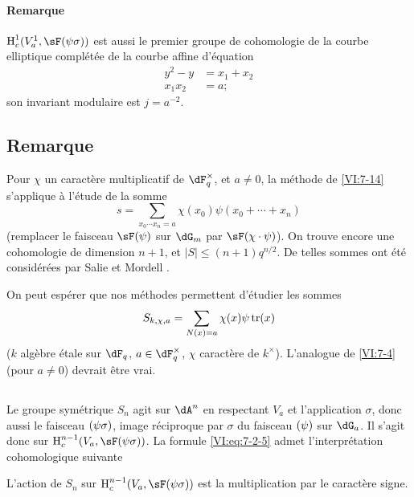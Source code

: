 \paragraph{Remarque}

$\h_c^1(V_a^1,\sF(\psi\sigma))$ est aussi le premier groupe de cohomologie de 
la courbe elliptique complétée de la courbe affine d'équation 
\begin{align*}
  y^2-y &= x_1+x_2 \\
  x_1 x_2 &= a \text{;} 
\end{align*}
son invariant modulaire est $j=a^{-2}$. 





\subsection{Remarque}\label{VI:7-18}

Pour $\chi$ un caractère multiplicatif de $\dF_q^\times$, et $a\ne 0$, la 
méthode de \ref{VI:7-14} s'applique à l'étude de la somme 
\[
  s = \sum_{x_0\dotsm x_n = a} \chi(x_0) \psi(x_0+\cdots + x_n) 
\]
(remplacer le faisceau $\sF(\psi)$ sur $\dG_m$ par $\sF(\chi\cdot \psi)$). On 
trouve encore une cohomologie de dimension $n+1$, et 
$|S|\leqslant (n+1)q^{n/2}$. De telles sommes ont été considérées par 
Salie et Mordell \cite{mo73}.

On peut espérer que nos méthodes permettent d'étudier les sommes 
\[
  S_{k,\chi,a} = \sum_{N(x)=a} \chi(x) \psi \operatorname{tr}(x) 
\]
($k$ algèbre étale sur $\dF_q$, $a\in \dF_q^\times$, $\chi$ caractère de 
$k^\times$). L'analogue de \ref{VI:7-4} (pour $a\ne 0$) devrait être vrai. 





\subsection{}\label{VI:7-19}

Le groupe symétrique $S_n$ agit sur $\dA^n$ en respectant $V_a$ et 
l'application $\sigma$, donc aussi le faisceau $\sf(\psi\sigma)$, image 
réciproque par $\sigma$ du faisceau $\sf(\psi)$ sur $\dG_a$. Il s'agit donc 
sur $\h_c^{n-1}(V_a,\sF(\psi\sigma))$. La formule \eqref{VI:eq:7-2-5} admet 
l'interprétation cohomologique suivante





\begin{proposition_}\label{VI:7-20}
L'action de $S_n$ sur $\h_c^{n-1}(V_a,\sF(\psi\sigma))$ est la multiplication 
par le caractère signe. 
\end{proposition_}

